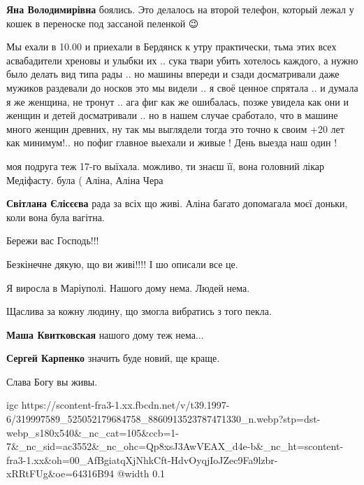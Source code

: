 \begin{itemize} %
\textbf{Яна Володимирівна} боялись. Это делалось на второй телефон, который лежал у кошек в переноске под зассаной пеленкой 😉
\end{itemize} %


Мы ехали в 10.00 и приехали в Бердянск к утру практически, тьма этих всех
асвабадители хреновы и улыбки их .. сука твари убить хотелось каждого, а нужно
было делать вид типа рады .. но машины впереди и сзади досматривали даже
мужиков раздевали до носков это мы видели .. я своё ценное спрятала .. и думала
я же женщина, не тронут .. ага фиг как же ошибалась, позже увидела как они и
женщин и детей досматривали .. но в нашем случае сработало, что в машине много
женщин древних, ну так мы выглядели тогда это точно к своим +20 лет как
минимум!.. но пофиг главное выехали и живые ! День выезда наш один !


моя подруга теж 17-го выїхала. можливо, ти знаєш її, вона головний лікар
Медіфасту. була ( Аліна, Аліна Чера

\begin{itemize} %
\textbf{Світлана Єлісєєва} рада за всіх що живі. Аліна багато допомагала моєї доньки, коли вона була вагітна.
\end{itemize} %


Бережи вас Господь!!!🙏🙏🙏


Безкінечне дякую, що ви живі!!!! І шо описали все це.

Я виросла в Маріуполі. Нашого дому нема. Людей нема.

Щаслива за кожну людину, що змогла вибратись з того пекла.

\begin{itemize} %
\textbf{Маша Квитковская} нашого дому теж нема...

\textbf{Сергей Карпенко} значить буде новий, ще краще.
\end{itemize} %


Слава Богу вы живы.

\ifcmt
  igc https://scontent-fra3-1.xx.fbcdn.net/v/t39.1997-6/319997589_525052179684758_8860913523787471330_n.webp?stp=dst-webp_s180x540&_nc_cat=105&ccb=1-7&_nc_sid=ac3552&_nc_ohc=Qp8xsJ3AwVEAX_d4e-b&_nc_ht=scontent-fra3-1.xx&oh=00_AfBgiatqXjNhkCft-HdvOyqjIoJZec9Fa9lzbr-xRRtFUg&oe=64316B94
	@width 0.1
\fi

